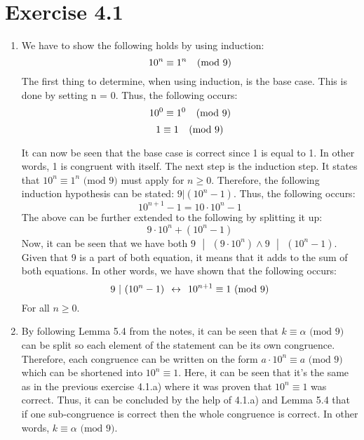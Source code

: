\section{Exercise 4.1}
\renewcommand{\labelenumi}{\alph{enumi})}
\begin{enumerate}
\item
We have to show the following holds by using induction:
\[10^n \equiv 1^n \mbox{\hspace{0.25cm} (mod 9)}\]
The first thing to determine, when using induction, is the base case. This is done by setting n = 0. Thus, the following occurs:
\[10^0 \equiv 1^0 \mbox{\hspace{0.25cm} (mod 9)}\]
\vspace{-8mm}
\[1 \equiv 1 \mbox{\hspace{0.25cm} (mod 9)}\]

It can now be seen that the base case is correct since 1 is equal to 1. In other words, 1 is congruent with itself. The next step is the induction step. It states that $10^n \equiv 1^n \mbox{ (mod 9)}$ must apply for $n \geq 0$. Therefore, the following induction hypothesis can be stated: $9 | (10^n - 1)$. Thus, the following occurs:
\[10^{n+1} - 1 = 10 \cdot 10^n - 1\]
The above can be further extended to the following by splitting it up:
\[9 \cdot 10^n + (10^n - 1)\]
Now, it can be seen that we have both $9 \mbox{ }| \mbox{ }(9 \cdot 10^n) \wedge 9\mbox{ }| \mbox{ }(10^n - 1)$. Given that 9 is a part of both equation, it means that it adds to the sum of both equations. In other words, we have shown that the following occurs:
\[9\mbox{ }| \mbox{ }(10^n - 1) \hspace{0.15cm} \leftrightarrow \hspace{0.15cm} 10^{n+1} \equiv 1 \mbox{ (mod 9)}\]
For all $n \geq 0$.

\item
By following Lemma 5.4 from the notes, it can be seen that $k \equiv \alpha \mbox{ (mod 9)}$ can be split so each element of the statement can be its own congruence. Therefore, each congruence can be written on the form $a \cdot 10^n \equiv a \mbox{ (mod 9)}$ which can be shortened into $10^n \equiv 1$. Here, it can be seen that it's the same as in the previous exercise 4.1.a) where it was proven that $10^n \equiv 1$ was correct. Thus, it can be concluded by the help of 4.1.a) and Lemma 5.4 that if one sub-congruence is correct then the whole congruence is correct. In other words, $k \equiv \alpha \mbox{ (mod 9)}$.


\end{enumerate}
